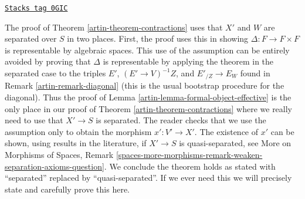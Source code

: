 \begin{remark}
\label{artin-remark-separated-needed}
\href{https://stacks.math.columbia.edu/tag/0GIC}{\texttt{Stacks tag 0GIC}}

The proof of Theorem \ref{artin-theorem-contractions} uses that $X'$ and $W$
are separated over $S$ in two places. First, the proof uses this in showing
$\Delta : F \to F \times F$ is representable by algebraic spaces.
This use of the assumption can be entirely avoided by proving
that $\Delta$ is representable by applying the theorem in the
separated case to the triples
$E'$, $(E' \to V)^{-1}Z$, and $E'_{/Z} \to E_W$
found in Remark \ref{artin-remark-diagonal} (this is the usual bootstrap
procedure for the diagonal). Thus the proof of
Lemma \ref{artin-lemma-formal-object-effective} is the only
place in our proof of Theorem \ref{artin-theorem-contractions}
where we really need to use that $X' \to S$ is separated.
The reader checks that we use the assumption only to obtain
the morphism $x' : V' \to X'$. The existence of $x'$ can be shown,
using results in the literature, if $X' \to S$ is quasi-separated, see
More on Morphisms of Spaces, Remark
\ref{spaces-more-morphisms-remark-weaken-separation-axioms-question}.
We conclude the theorem holds as stated with
``separated'' replaced by ``quasi-separated''. If we ever need this
we will precisely state and carefully prove this here.
\end{remark}



